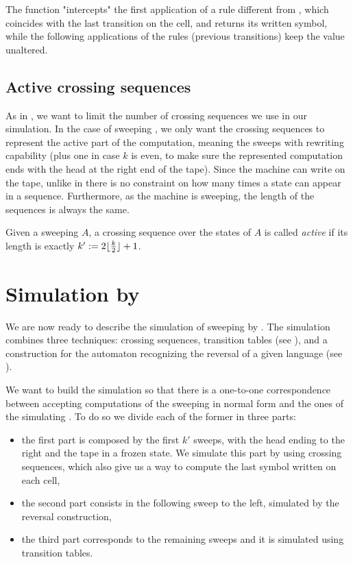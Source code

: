The function "intercepts" the first application of a rule different from , which coincides with the last transition on the cell, and returns its written symbol, while the following applications of the rules (previous transitions) keep the value unaltered.


\subsection{Active crossing sequences}
As in \TDFAs, we want to limit the number of crossing sequences we use in our simulation.
In the case of sweeping \kDLAs, we only want the crossing sequences to represent the active part of the computation, meaning the sweeps with rewriting capability (plus one in case $k$ is even, to make sure the represented computation ends with the head at the right end of the tape).
Since the machine can write on the tape, unlike in \TDFAs there is no constraint on how many times a state can appear in a sequence. Furthermore, as the machine is sweeping, the length of the sequences is always the same.
\begin{defn}
	Given a sweeping \kLA $A$, a crossing sequence over the states of $A$ is called \emph{active} if its length is exactly $k':=2\lfloor \frac{k}{2} \rfloor+1$.
\end{defn}



\section{Simulation by \texorpdfstring{\ONFAs}{1NFAs}}\label{sec:swkdla-to-NFA}
We are now ready to describe the simulation of sweeping \kDLAs by \ONFAs.
The simulation combines three techniques: crossing sequences, transition tables (see ), and a construction for the automaton recognizing the reversal of a given language (see ).

We want to build the simulation so that there is a one-to-one correspondence between accepting computations of the sweeping \kDLA in normal form and the ones of the simulating \ONFA.
To do so we divide each of the former in three parts:
\begin{itemize}
	\item the first part is composed by the first $k'$ sweeps, with the head ending to the right and the tape in a frozen state. We simulate this part by using crossing sequences, which also give us a way to compute the last symbol written on each cell,
	\item the second part consists in the following sweep to the left, simulated by the reversal construction,
	\item the third part corresponds to the remaining sweeps and it is simulated using transition tables.
\end{itemize}

